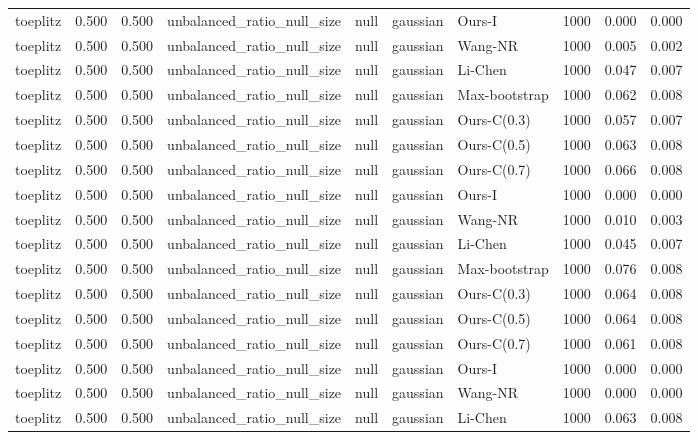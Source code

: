 \begin{tabular}{lrrllllrrr}
toeplitz & 0.500 & 0.500 & unbalanced\_ratio\_null\_size & null & gaussian & Ours-I & 1000 & 0.000 & 0.000 \\
toeplitz & 0.500 & 0.500 & unbalanced\_ratio\_null\_size & null & gaussian & Wang-NR & 1000 & 0.005 & 0.002 \\
toeplitz & 0.500 & 0.500 & unbalanced\_ratio\_null\_size & null & gaussian & Li-Chen & 1000 & 0.047 & 0.007 \\
toeplitz & 0.500 & 0.500 & unbalanced\_ratio\_null\_size & null & gaussian & Max-bootstrap & 1000 & 0.062 & 0.008 \\
toeplitz & 0.500 & 0.500 & unbalanced\_ratio\_null\_size & null & gaussian & Ours-C(0.3) & 1000 & 0.057 & 0.007 \\
toeplitz & 0.500 & 0.500 & unbalanced\_ratio\_null\_size & null & gaussian & Ours-C(0.5) & 1000 & 0.063 & 0.008 \\
toeplitz & 0.500 & 0.500 & unbalanced\_ratio\_null\_size & null & gaussian & Ours-C(0.7) & 1000 & 0.066 & 0.008 \\
toeplitz & 0.500 & 0.500 & unbalanced\_ratio\_null\_size & null & gaussian & Ours-I & 1000 & 0.000 & 0.000 \\
toeplitz & 0.500 & 0.500 & unbalanced\_ratio\_null\_size & null & gaussian & Wang-NR & 1000 & 0.010 & 0.003 \\
toeplitz & 0.500 & 0.500 & unbalanced\_ratio\_null\_size & null & gaussian & Li-Chen & 1000 & 0.045 & 0.007 \\
toeplitz & 0.500 & 0.500 & unbalanced\_ratio\_null\_size & null & gaussian & Max-bootstrap & 1000 & 0.076 & 0.008 \\
toeplitz & 0.500 & 0.500 & unbalanced\_ratio\_null\_size & null & gaussian & Ours-C(0.3) & 1000 & 0.064 & 0.008 \\
toeplitz & 0.500 & 0.500 & unbalanced\_ratio\_null\_size & null & gaussian & Ours-C(0.5) & 1000 & 0.064 & 0.008 \\
toeplitz & 0.500 & 0.500 & unbalanced\_ratio\_null\_size & null & gaussian & Ours-C(0.7) & 1000 & 0.061 & 0.008 \\
toeplitz & 0.500 & 0.500 & unbalanced\_ratio\_null\_size & null & gaussian & Ours-I & 1000 & 0.000 & 0.000 \\
toeplitz & 0.500 & 0.500 & unbalanced\_ratio\_null\_size & null & gaussian & Wang-NR & 1000 & 0.000 & 0.000 \\
toeplitz & 0.500 & 0.500 & unbalanced\_ratio\_null\_size & null & gaussian & Li-Chen & 1000 & 0.063 & 0.008 \\

\end{tabular}
